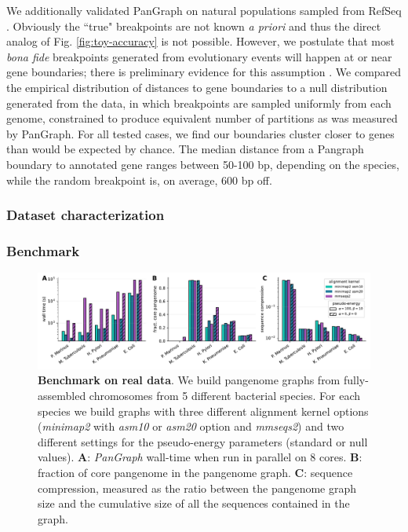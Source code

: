 \documentclass[aps,rmp,reprint,superscriptaddress,notitlepage,10pt]{revtex4-1}
\begin{document}
We additionally validated PanGraph on natural populations sampled from RefSeq \cite{o2016reference}.
Obviously the ``true" breakpoints are not known \emph{a priori} and thus the direct analog of Fig. \ref{fig:toy-accuracy} is not possible.
However, we postulate that most \emph{bona fide} breakpoints generated from evolutionary events will happen at or near gene boundaries; there is preliminary evidence for this assumption \cite{oliveira2017chromosomal}.
We compared the empirical distribution of distances to gene boundaries to a null distribution generated from the data, in which breakpoints are sampled uniformly from each genome, constrained to produce equivalent number of partitions as was measured by PanGraph.
For all tested cases, we find our boundaries cluster closer to genes than would be expected by chance.
The median distance from a Pangraph boundary to annotated gene ranges between 50-100 bp, depending on the species, while the random breakpoint is, on average, 600 bp off.

\subsubsection*{Dataset characterization}

\subsubsection*{Benchmark}

\begin{figure}[htb]
    \includegraphics[width=\textwidth]{figs/panx_benchmark.pdf}
    \caption{{\bf Benchmark on real data}.
        We build pangenome graphs from fully-assembled chromosomes from 5 different bacterial species. For each species we build graphs with three different alignment kernel options (\textit{minimap2} with \textit{asm10} or \textit{asm20} option and \textit{mmseqs2}) and two different settings for the pseudo-energy parameters (standard or null values).
        \textbf{A}: \textit{PanGraph} wall-time when run in parallel on 8 cores.
        \textbf{B}: fraction of core pangenome in the pangenome graph.
        \textbf{C}: sequence compression, measured as the ratio between the pangenome graph size and the cumulative size of all the sequences contained in the graph.
    }
    \label{fig:panx-benchmark}
\end{figure}
\end{document}
